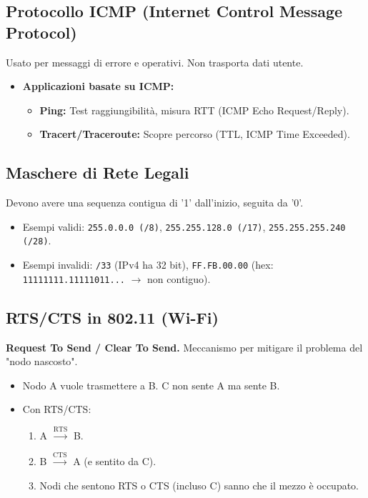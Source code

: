 \subsection{Protocollo ICMP (Internet Control Message Protocol)}
Usato per messaggi di errore e operativi. Non trasporta dati utente.
\begin{itemize}
    \item \textbf{Applicazioni basate su ICMP:}
    \begin{itemize}
        \item \textbf{Ping:} Test raggiungibilità, misura RTT (ICMP Echo Request/Reply).
        \item \textbf{Tracert/Traceroute:} Scopre percorso (TTL, ICMP Time Exceeded).
    \end{itemize}
\end{itemize}

\subsection{Maschere di Rete Legali}
Devono avere una sequenza contigua di '1' dall'inizio, seguita da '0'.
\begin{itemize}
    \item Esempi validi: \texttt{255.0.0.0 (/8)}, \texttt{255.255.128.0 (/17)}, \texttt{255.255.255.240 (/28)}.
    \item Esempi invalidi: \texttt{/33} (IPv4 ha 32 bit), \texttt{FF.FB.00.00} (hex: \texttt{11111111.11111011...} $\rightarrow$ non contiguo).
\end{itemize}

\subsection{RTS/CTS in 802.11 (Wi-Fi)}
\textbf{Request To Send / Clear To Send.} Meccanismo per mitigare il problema del "nodo nascosto".
\begin{itemize}
    \item Nodo A vuole trasmettere a B. C non sente A ma sente B.
    \item Con RTS/CTS:
    \begin{enumerate}
        \item A $\xrightarrow{\text{RTS}}$ B.
        \item B $\xrightarrow{\text{CTS}}$ A (e sentito da C).
        \item Nodi che sentono RTS o CTS (incluso C) sanno che il mezzo è occupato.
    \end{enumerate}
\end{itemize}

